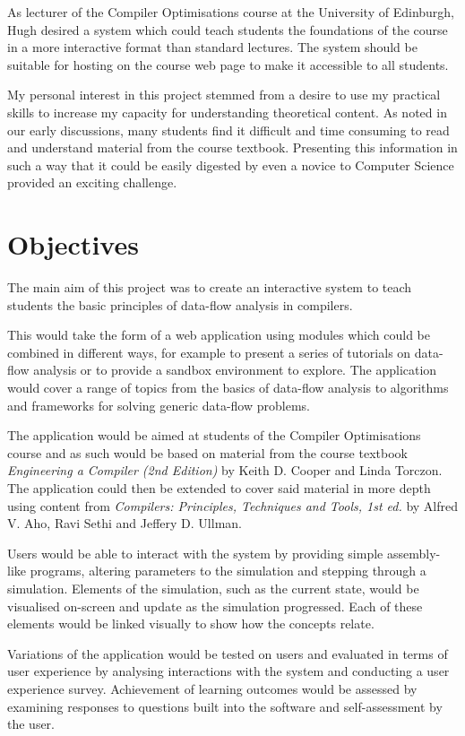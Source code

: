 \documentclass[bsc,twoside,singlespacing,parskip,logo]{infthesis}     %
\begin{document}
    As lecturer of the Compiler Optimisations course at the University of Edinburgh, Hugh desired a system which could teach students the foundations of the course in a more interactive format than standard lectures. The system should be suitable for hosting on the course web page to make it accessible to all students.
    
    My personal interest in this project stemmed from a desire to use my practical skills to increase my capacity for understanding theoretical content. As noted in our early discussions, many students find it difficult and time consuming to read and understand material from the course textbook. Presenting this information in such a way that it could be easily digested by even a novice to Computer Science provided an exciting challenge.
    
    
    \section{Objectives}
    The main aim of this project was to create an interactive system to teach students the basic principles of data-flow analysis in compilers.
    
    This would take the form of a web application using modules which could be combined in different ways, for example to present a series of tutorials on data-flow analysis or to provide a sandbox environment to explore. The application would cover a range of topics from the basics of data-flow analysis to algorithms and frameworks for solving generic data-flow problems.
    
    The application would be aimed at students of the Compiler Optimisations course and as such would be based on material from the course textbook {\em Engineering a Compiler (2nd Edition)} by Keith D. Cooper and Linda Torczon. The application could then be extended to cover said material in more depth using content from {\em Compilers: Principles, Techniques and Tools, 1st ed.} by Alfred V. Aho, Ravi Sethi and Jeffery D. Ullman.
    
    Users would be able to interact with the system by providing simple assembly-like programs, altering parameters to the simulation and stepping through a simulation. Elements of the simulation, such as the current state, would be visualised on-screen and update as the simulation progressed. Each of these elements would be linked visually to show how the concepts relate.
    
    Variations of the application would be tested on users and evaluated in terms of user experience by analysing interactions with the system and conducting a user experience survey. Achievement of learning outcomes would be assessed by examining responses to questions built into the software and self-assessment by the user.
    
\end{document}
